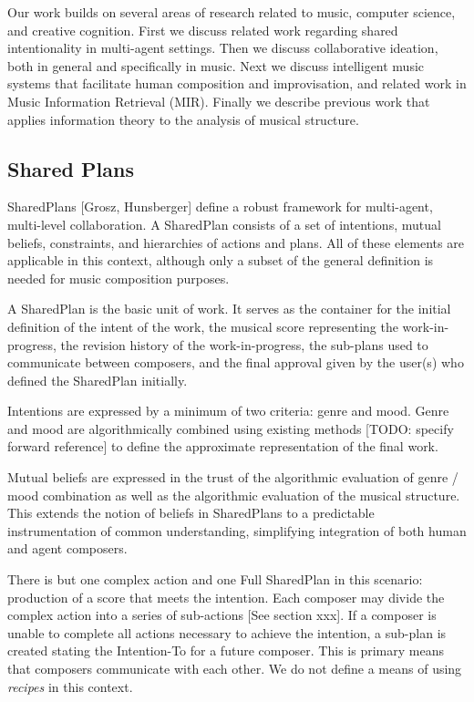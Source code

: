 \documentclass[final,authoryear,5p,times,twocolumn]{elsarticle}
\begin{document}
Our work builds on several areas of research related to music, computer science, and creative cognition. First we discuss related work regarding shared intentionality in multi-agent settings. Then we discuss collaborative ideation, both in general and specifically in music. Next we discuss intelligent music systems that facilitate human composition and improvisation, and related work in Music Information Retrieval (MIR). Finally we describe previous work that applies information theory to the analysis of musical structure.

\subsection{Shared Plans}

SharedPlans [Grosz, Hunsberger] define a robust framework for multi-agent, multi-level collaboration. A SharedPlan consists of a set of intentions, mutual beliefs, constraints, and hierarchies of actions and plans. All of these elements are applicable in this context, although only a subset of the general definition is needed for music composition purposes. 

A SharedPlan is the basic unit of work. It serves as the container for the initial definition of the intent of the work, the musical score representing the work-in-progress, the revision history of the work-in-progress, the sub-plans used to communicate between composers, and the final approval given by the user(s) who defined the SharedPlan initially.

Intentions are expressed by a minimum of two criteria: genre and mood. Genre and mood are algorithmically combined using existing methods [TODO: specify forward reference] to define the approximate representation of the final work.
  
Mutual beliefs are expressed in the trust of the algorithmic evaluation of genre / mood combination as well as the algorithmic evaluation of the musical structure. This extends the notion of beliefs in SharedPlans to a predictable instrumentation of common understanding, simplifying integration of both human and agent composers. 

There is but one complex action and one Full SharedPlan in this scenario: production of a score that meets the intention. Each composer may divide the complex action into a series of sub-actions [See section xxx]. If a composer is unable to complete all actions necessary to achieve the intention, a sub-plan is created stating the Intention-To for a future composer. This is primary means that composers communicate with each other. We do not define a means of using \textit{recipes} in this context.
\end{document}
